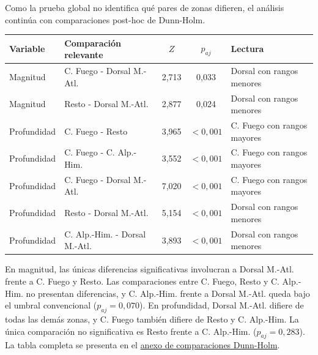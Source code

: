 \documentclass[
  spanish,
  letterpaper,
  DIV=11,
  numbers=noendperiod]{scrartcl}
\begin{document}
Como la prueba global no identifica qué pares de zonas difieren, el
análisis continúa con comparaciones post-hoc de Dunn-Holm.

\begingroup
\scriptsize
\centering
\setlength{\tabcolsep}{1.0pt}
\renewcommand{\arraystretch}{0.82}
{}
\label{tbl-dunn-resumen-mag-depth}
\hypertarget{dest-tbl-dunn-resumen-mag-depth}{}
\begin{tabular}{@{}l@{\hspace{1.2em}}l@{\hspace{0.9em}}c@{\hspace{0.9em}}c@{\hspace{1.2em}}l@{}}
\toprule
Variable & Comparación relevante & $Z$ & $p_{aj}$ & Lectura \\
\midrule
Magnitud & C. Fuego - Dorsal M.-Atl. & 2,713 & 0,033 & Dorsal con rangos menores \\
Magnitud & Resto - Dorsal M.-Atl. & 2,877 & 0,024 & Dorsal con rangos menores \\
Profundidad & C. Fuego - Resto & 3,965 & $<0{,}001$ & C. Fuego con rangos mayores \\
Profundidad & C. Fuego - C. Alp.-Him. & 3,552 & $<0{,}001$ & C. Fuego con rangos mayores \\
Profundidad & C. Fuego - Dorsal M.-Atl. & 7,020 & $<0{,}001$ & C. Fuego con rangos mayores \\
Profundidad & Resto - Dorsal M.-Atl. & 5,154 & $<0{,}001$ & Dorsal con rangos menores \\
Profundidad & C. Alp.-Him. - Dorsal M.-Atl. & 3,893 & $<0{,}001$ & Dorsal con rangos menores \\
\bottomrule
\end{tabular}
\par\vspace{-0.85em}
\endgroup

En magnitud, las únicas diferencias significativas involucran a Dorsal
M.-Atl. frente a C. Fuego y Resto. Las comparaciones entre C. Fuego,
Resto y C. Alp.-Him. no presentan diferencias, y C. Alp.-Him. frente a
Dorsal M.-Atl. queda bajo el umbral convencional (\(p_{aj}=0{,}070\)).
En profundidad, Dorsal M.-Atl. difiere de todas las demás zonas, y C.
Fuego también difiere de Resto y C. Alp.-Him. La única comparación no
significativa es Resto frente a C. Alp.-Him. (\(p_{aj}=0{,}283\)). La
tabla completa se presenta en el
\hyperref[sec-anexo-dunn]{anexo de comparaciones Dunn-Holm}.
\end{document}
